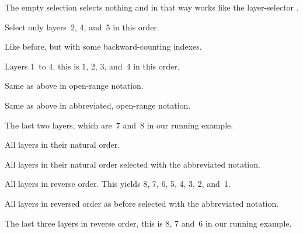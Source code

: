 \begin{codelist}
  \newcommand*{\lspec}[1]{\mbox{\val*{val:LAYERSPEC_OPEN}{#1}\val*{val:LAYERSPEC_CLOSE}}}%
\item[\lspec{}] The empty selection selects nothing and in that way works like the
  layer-selector .

\item[\lspec{2 :\ 4 :\ 5}] Select only layers~2, 4, and~5 in this order.

\item[\lspec{2 :\ -4 :\ -3}] Like before, but with some backward-counting indexes.

\item[\lspec{1 \val*{val:layer-range-separator}\ 4}] Layers 1~to 4, this is 1, 2, 3, and~4 in
  this order.

\item[\lspec{\val*{val:layer-range-empty-index-symbol}\ \val*{val:layer-range-separator}\ 4}]
  Same as above in open-range notation.

\item[\lspec{\val*{val:layer-range-separator}\ 4}] Same as above in abbreviated, open-range
  notation.

\item[\lspec{-2 \val*{val:layer-range-separator}\ \val*{val:layer-range-empty-index-symbol}}]
  The last two layers, which are~7 and~8 in our running example.

\item[\lspec{\val*{val:layer-range-empty-index-symbol}\ \val*{val:layer-range-separator}\ \val*{val:layer-range-empty-index-symbol}}]
  All layers in their natural order.

\item[\lspec{\val*{val:layer-range-separator}}] All layers in their natural order selected with
  the abbreviated notation.

\item[\lspec{reverse
    \val*{val:layer-range-empty-index-symbol}\ \val*{val:layer-range-separator}\ \val*{val:layer-range-empty-index-symbol}}]
  All layers in reverse order.  This yields 8, 7, 6, 5, 4, 3, 2, and~1.

\item[\lspec{rev \val*{val:layer-range-separator}}] All layers in reversed order as before
  selected with the abbreviated notation.

\item[\lspec{r -3 \val*{val:layer-range-separator}}] The last three layers in reverse order,
  this is 8, 7 and~6 in our running example.
\end{codelist}

